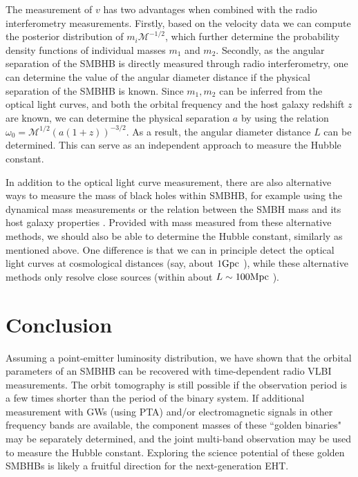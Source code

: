 \documentclass[twocolumn]{aastex62}
\begin{document}
 The measurement of $v$ has two advantages when combined with the radio interferometry measurements. Firstly, based on the velocity data we can compute the posterior distribution of $m_i {\mathcal{M}}^{-1/2}$, which further determine the probability density functions of individual masses $m_1$ and $m_2$. Secondly, 
 as the angular separation   of the SMBHB is directly measured through radio interferometry, one can  determine the value of the angular diameter distance if the physical separation of the SMBHB is known. 
 Since $m_1, m_2$ can be inferred from the optical light curves, and both the orbital frequency and the host galaxy redshift $z$ are known, we can determine the physical separation $a$ by using the relation $\omega_0={\mathcal{M}}^{1/2}(a(1+z))^{-3/2}$. As a result, the angular diameter distance $L$  can be determined. This can serve as an independent approach to measure
the Hubble constant.

In addition to the optical light curve measurement, there are also alternative ways to measure the  mass of black holes within SMBHB, for example using the dynamical mass measurements or the relation between the SMBH mass and its host galaxy properties \citep[see, e.g., ][]{Peterson2014, Schutz:2015pza}. Provided with  mass measured from these alternative methods, we should also be able to determine the Hubble constant, similarly as mentioned above. One difference is that we can in principle detect the optical light curves at cosmological distances (say, about $1{\rm Gpc}$ \citep{Graham2015, DOrazio:2015nature, Valtonen2008Natur, Komossa2021}), while these alternative methods only resolve close sources (within about $L \sim 100 {\rm Mpc}$ \citep{Schutz:2015pza}).  

\section{Conclusion}

Assuming a point-emitter luminosity distribution, we have shown that the orbital parameters of an SMBHB can be recovered with time-dependent radio VLBI measurements. The orbit tomography is still possible if the observation period is a few times shorter than the period of the binary system.  If additional measurement with GWs (using PTA) and/or electromagnetic signals in other frequency bands are available, the component masses of these ``golden binaries" may be separately determined, and the joint multi-band observation may be used to measure the Hubble constant. Exploring the science potential of these golden SMBHBs is  likely a fruitful direction for the next-generation EHT.
\end{document}

